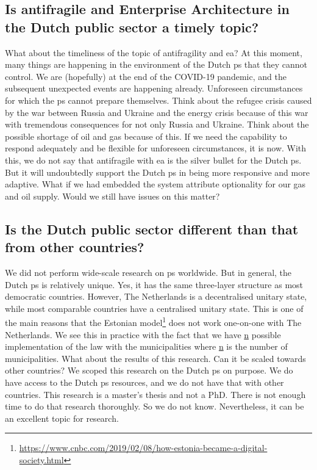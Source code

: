 \subsection{Is antifragile and Enterprise Architecture in the Dutch public sector a timely topic?}
\label{sub:timelytopic}
What about the timeliness of the topic of \gls{antifragility} and \gls{ea}? At this moment, many things are happening in the environment of the Dutch \gls{ps} that they cannot control. We are (hopefully) at the end of the COVID-19 pandemic, and the subsequent unexpected events are happening already. Unforeseen circumstances for which the \gls{ps} cannot prepare themselves. Think about the refugee crisis caused by the war between Russia and Ukraine and the energy crisis because of this war with tremendous consequences for not only Russia and Ukraine. Think about the possible shortage of oil and gas because of this. If we need the capability to respond adequately and be flexible for unforeseen circumstances, it is now. With this, we do not say that \gls{antifragile} with \gls{ea} is the silver bullet for the Dutch \gls{ps}. But it will undoubtedly support the Dutch \gls{ps} in being more responsive and more adaptive. What if we had embedded the system \gls{attribute} \gls{optionality} for our gas and oil supply. Would we still have issues on this matter?

\subsection{Is the Dutch public sector different than that from other countries?}
\label{sub:differencepublicsector}
We did not perform wide-scale research on \gls{ps} worldwide. But in general, the Dutch \gls{ps} is relatively unique. Yes, it has the same three-layer structure as most democratic countries. However, The Netherlands is a decentralised unitary state, while most comparable countries have a centralised unitary state. This is one of the main reasons that the Estonian model\footnote{\url{https://www.cnbc.com/2019/02/08/how-estonia-became-a-digital-society.html}} does not work one-on-one with The Netherlands. We see this in practice with the fact that we have \underline{n} possible implementation of the law with the municipalities where \underline{n} is the number of municipalities. What about the results of this research. Can it be scaled towards other countries? We scoped this research on the Dutch \gls{ps} on purpose. We do have access to the Dutch \gls{ps} resources, and we do not have that with other countries. This research is a master's thesis and not a PhD. There is not enough time to do that research thoroughly. So we do not know. Nevertheless, it can be an excellent topic for research.

